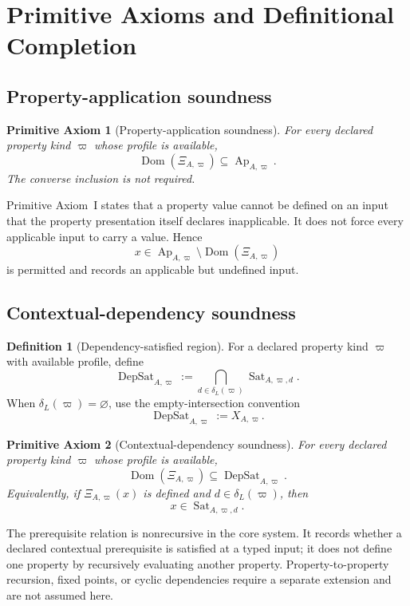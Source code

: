 \documentclass[11pt]{article}
\newcommand{\Ap}{\operatorname{Ap}}
\newcommand{\DepSat}{\operatorname{DepSat}}
\newcommand{\Sat}{\operatorname{Sat}}
\newcommand{\Dom}{\operatorname{Dom}}
\newtheorem{axiom}{Primitive Axiom}
\theoremstyle{definition}
\newtheorem{definition}[theorem]{Definition}
\theoremstyle{remark}
\begin{document}
\section{Primitive Axioms and Definitional Completion}
\label{sec:axioms}

\subsection{Property-application soundness}

\begin{axiom}[Property-application soundness]
\label{ax:application}
For every declared property kind \(\varpi\) whose profile is available,
\[
\Dom(\Xi_{A,\varpi})\subseteq\Ap_{A,\varpi}.
\]
The converse inclusion is not required.
\end{axiom}

Primitive Axiom~I states that a property value cannot be defined on an input that the property presentation itself declares inapplicable.
It does not force every applicable input to carry a value.
Hence
\[
x\in\Ap_{A,\varpi}\setminus\Dom(\Xi_{A,\varpi})
\]
is permitted and records an applicable but undefined input.

\subsection{Contextual-dependency soundness}

\begin{definition}[Dependency-satisfied region]
For a declared property kind \(\varpi\) with available profile, define
\[
\DepSat_{A,\varpi}:=
\bigcap_{d\in\delta_L(\varpi)}\Sat_{A,\varpi,d}.
\]
When \(\delta_L(\varpi)=\varnothing\), use the empty-intersection convention
\[
\DepSat_{A,\varpi}:=X_{A,\varpi}.
\]
\end{definition}

\begin{axiom}[Contextual-dependency soundness]
\label{ax:dependency}
For every declared property kind \(\varpi\) whose profile is available,
\[
\Dom(\Xi_{A,\varpi})\subseteq\DepSat_{A,\varpi}.
\]
Equivalently, if \(\Xi_{A,\varpi}(x)\) is defined and \(d\in\delta_L(\varpi)\), then
\[
x\in\Sat_{A,\varpi,d}.
\]
\end{axiom}

The prerequisite relation is nonrecursive in the core system.
It records whether a declared contextual prerequisite is satisfied at a typed input; it does not define one property by recursively evaluating another property.
Property-to-property recursion, fixed points, or cyclic dependencies require a separate extension and are not assumed here.
\end{document}
